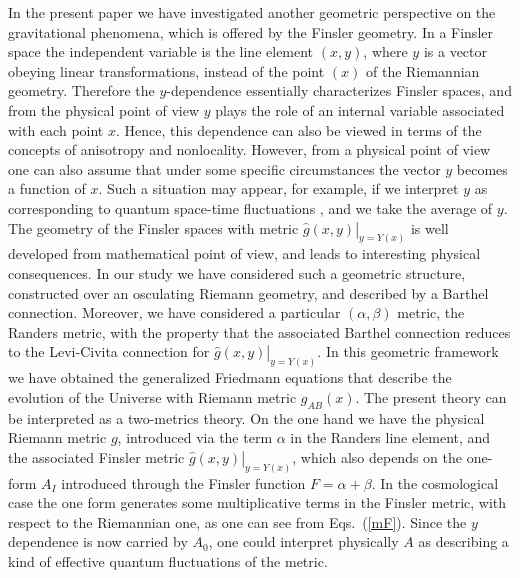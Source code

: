 \documentclass[aps,superscriptaddress, showpacs,preprintnumbers, superscriptaddress, nofootinbibt,twocolumn]{revtex4-2}
\begin{document}
In the present paper we have investigated another geometric perspective on the gravitational phenomena, which is offered by the Finsler geometry. In a Finsler space the independent variable is the line element $(x,y)$, where $y$ is a vector obeying linear transformations,  instead of the point $(x)$ of the Riemannian geometry. Therefore the $y$-dependence essentially characterizes Finsler spaces, and from the physical point of view $y$ plays the role of an internal variable associated with each point $x$. Hence, this dependence can also be viewed in terms of the concepts of anisotropy and nonlocality. However, from a physical point of view one can also assume that under some specific circumstances the vector $y$ becomes a function of $x$. Such a situation may appear, for example, if we interpret $y$ as corresponding to quantum space-time fluctuations \cite{Ikeda}, and we take the average of $y$. The geometry of the Finsler spaces with metric $\left.\hat{g}(x,y)\right|_{y=Y(x)}$ is well developed from mathematical point of view, and leads to interesting physical consequences. In our study we have considered such a geometric structure, constructed over an osculating Riemann geometry, and described by a Barthel connection. Moreover, we have considered a particular $(\alpha, \beta)$ metric, the Randers metric, with the property that the associated Barthel connection reduces to the Levi-Civita connection for $\left.\hat{g}(x,y)\right|_{y=Y(x)}$. In this geometric framework we have obtained the generalized Friedmann equations that describe the evolution of the Universe with Riemann metric $g_{AB}(x)$. The present theory can be interpreted as a two-metrics theory. On the one hand we have the physical Riemann metric $g$, introduced via the term $\alpha$ in the Randers line element, and the associated Finsler metric $\left.\hat{g}(x,y)\right|_{y=Y(x)}$, which also depends on the one-form $A_I$ introduced through the Finsler function $F=\alpha +\beta$. In the cosmological case the one form generates some multiplicative terms in the Finsler metric, with respect to the Riemannian one, as one can see from Eqs.~(\ref{mF}). Since the $y$ dependence is now carried by $A_0$, one could interpret physically $A$ as describing a kind of effective quantum fluctuations of the metric.
\end{document}
